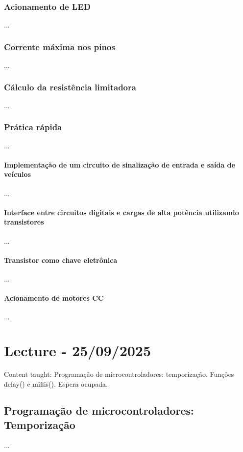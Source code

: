 \documentclass{article}
\begin{document}
\subsubsection{Acionamento de LED}
...

\subsubsection{Corrente máxima nos pinos}
...

\subsubsection{Cálculo da resistência limitadora}
...

\subsubsection{Prática rápida}
...

\paragraph{Implementação de um circuito de sinalização de entrada e saída de veículos}
...

\paragraph{Interface entre circuitos digitais e cargas de alta potência utilizando transistores}
...

\paragraph{Transistor como chave eletrônica}
...

\paragraph{Acionamento de motores CC}
...

\section{Lecture - 25/09/2025}
Content taught:  Programação de microcontroladores: temporização. Funções delay() e millis(). Espera ocupada.

\subsection{Programação de microcontroladores: Temporização}
...
\end{document}
